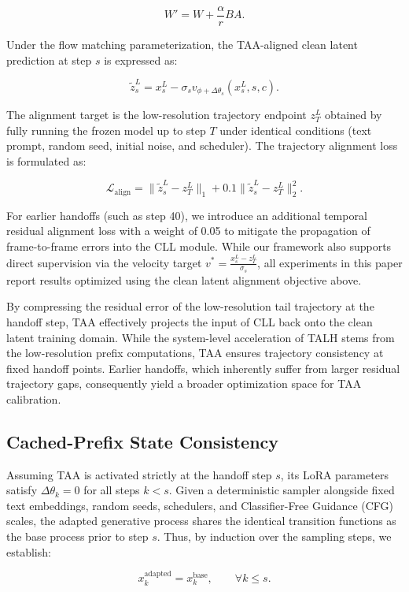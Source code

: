 \[
W'=W+\frac{\alpha}{r}BA.
\]

Under the flow matching parameterization, the TAA-aligned clean latent
prediction at step \(s\) is expressed as:

\[
\widetilde z_s^L
=x_s^L-\sigma_s v_{\phi+\Delta\theta_s}(x_s^L,s,c).
\]

The alignment target is the low-resolution trajectory endpoint \(z_T^L\)
obtained by fully running the frozen model up to step \(T\) under
identical conditions (text prompt, random seed, initial noise, and
scheduler). The trajectory alignment loss is formulated as:

\[
\mathcal L_{\mathrm{align}}
=\lVert\widetilde z_s^L-z_T^L\rVert_1
+0.1\lVert\widetilde z_s^L-z_T^L\rVert_2^2.
\]

For earlier handoffs (such as step 40), we introduce an additional
temporal residual alignment loss with a weight of 0.05 to mitigate the
propagation of frame-to-frame errors into the CLL module. While our
framework also supports direct supervision via the velocity target
\(v^*=\frac{x_s^L-z_T^L}{\sigma_s}\), all experiments in this paper
report results optimized using the clean latent alignment objective
above.

By compressing the residual error of the low-resolution tail trajectory
at the handoff step, TAA effectively projects the input of CLL back onto
the clean latent training domain. While the system-level acceleration of
TALH stems from the low-resolution prefix computations, TAA ensures
trajectory consistency at fixed handoff points. Earlier handoffs, which
inherently suffer from larger residual trajectory gaps, consequently
yield a broader optimization space for TAA calibration.

\subsection{Cached-Prefix State Consistency}
\label{sec:cached}

Assuming TAA is activated strictly at the handoff step \(s\), its LoRA
parameters satisfy \(\Delta\theta_k=0\) for all steps \(k < s\). Given a
deterministic sampler alongside fixed text embeddings, random seeds,
schedulers, and Classifier-Free Guidance (CFG) scales, the adapted
generative process shares the identical transition functions as the base
process prior to step \(s\). Thus, by induction over the sampling steps,
we establish:

\[
x_k^{\mathrm{adapted}}=x_k^{\mathrm{base}},
\qquad \forall k\leq s.
\]

